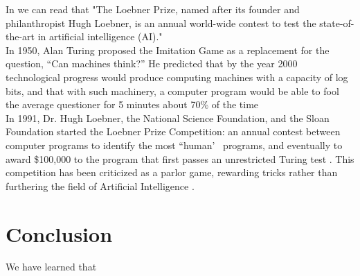 \documentclass[12pt,twoside]{article}
\theoremstyle{plain}
\theoremstyle{definition}
\theoremstyle{remark}
\begin{document}
	In \cite{loebner2011} we can read that "The Loebner Prize, named after its founder and philanthropist Hugh Loebner, is an annual world-wide contest to test the state-of-the-art in artificial intelligence (AI)."\\
	
In 1950, Alan Turing proposed the Imitation Game as a replacement for the question, “Can machines think?” He predicted that by the year 2000 technological progress would produce computing machines with a capacity of log bits, and that with such machinery, a computer program would be able to fool the average questioner for 5 minutes about 70\% of the time \cite{turing2009computing}\\

In 1991, Dr. Hugh Loebner, the National Science Foundation, and the Sloan Foundation started the Loebner Prize Competition: an annual contest between computer programs to identify the most “human’~ programs, and eventually to award \$100,000 to the program that first passes an unrestricted Turing test \cite{epstein1992quest}. This competition has been criticized as a parlor game, rewarding tricks rather than furthering the field of Artificial Intelligence \cite{shieber1994lessons}. \\

\section{Conclusion}
\label{sec:conclusion}

We have learned that

%
%
\nocite{*}

\newpage


\end{document}
